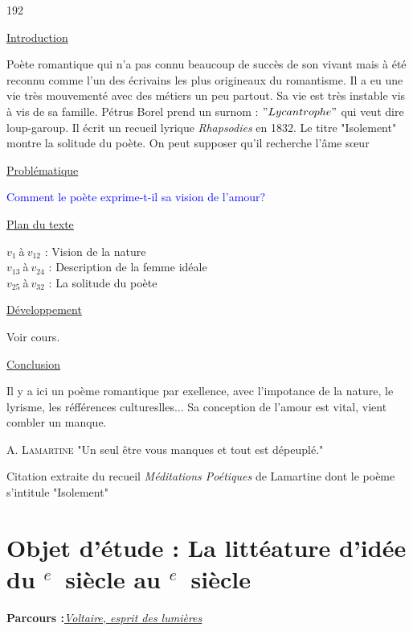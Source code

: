 \documentclass[12pt,a4paper]{article}
\begin{document}
\begin{dingautolist}{192}

\item \underline{Introduction} \par
		Po\`ete romantique qui n'a pas connu beaucoup de succ\`es de son vivant mais \`a \'et\'e reconnu comme l'un des \'ecrivains les plus origineaux du romantisme. 
		Il a eu une vie tr\`es mouvement\'e avec des m\'etiers un peu partout. Sa vie est tr\`es instable vis \`a vis de sa famille. P\'etrus Borel prend un surnom : $"Lycantrophe"$ qui veut dire loup-garoup. 
		Il \'ecrit un recueil lyrique \textit{Rhapsodies} en 1832. Le titre "Isolement" montre la solitude du po\`ete. On peut supposer qu'il recherche l'\^ame s\oe ur

\item \underline{Probl\'ematique }\par
		\textcolor{blue}{Comment le po\`ete exprime-t-il sa vision de l'amour?}

\item \underline{Plan du texte} \par
		$v_{1}~$\`a$~v_{12}$ : Vision de la nature\\
		$v_{13}~$\`a$~v_{24}$ : Description de la femme id\'eale\\
		$v_{25}~$\`a$~v_{32}$ : La solitude du po\`ete

\item \underline{D\'eveloppement} \par
		Voir cours.

\item \underline{Conclusion} \par
		Il y a ici un po\`eme romantique par exellence, avec l'impotance de la nature, le lyrisme, les r\'eff\'erences cultureslles... Sa conception de l'amour est vital, vient combler un manque.\par 
		A. \textsc{Lamartine}
		"Un seul \^etre vous manques et tout est d\'epeupl\'e."
		
		Citation extraite du recueil \textit{M\'editations Po\'etiques} de Lamartine dont le po\`eme s'intitule "Isolement"  		



\end{dingautolist}		
 \newpage

		\section[Voltaire, esprit des Lumi\`eres]{Objet d'\'etude : La litt\'eature d'id\'ee du \textsc{}$^{e}$~siècle au \textsc{}$^{e}$~siècle}
		\textbf{Parcours :}\textit{\underline{Voltaire, esprit des lumi\`eres}}
\end{document}
